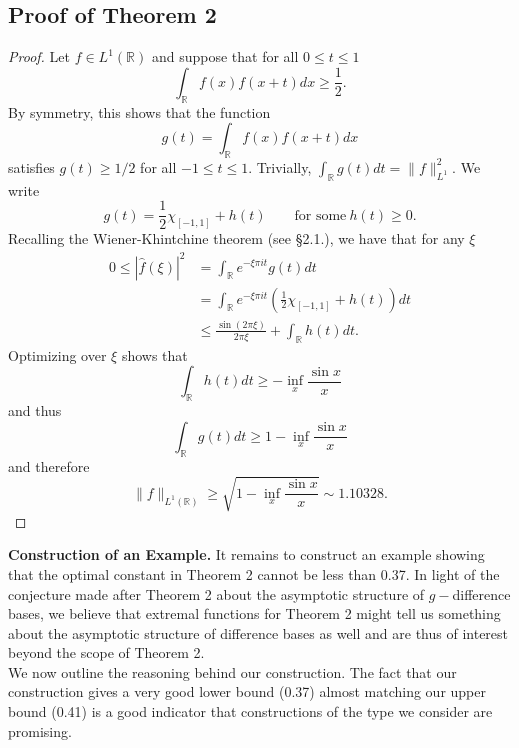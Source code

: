 \documentclass{amsart}
\theoremstyle{remark}
\begin{document}
{\subsection{Proof of Theorem 2}
\begin{proof} 
Let $f \in L^1(\mathbb{R})$ and suppose that for all $0 \leq t \leq 1$
$$ \int_{\mathbb{R}}{f(x)f(x+t)dx} \geq \frac{1}{2}.$$
By symmetry, this shows that the function
$$ g(t) =  \int_{\mathbb{R}}{f(x)f(x+t)dx}$$
satisfies $g(t) \geq 1/2$ for all $-1 \leq t \leq 1$.
Trivially, $\int_{\mathbb{R}}{g(t) dt} = \|f\|_{L^1}^2$. We write
$$ g(t) = \frac{1}{2} \chi_{[-1,1]} + h(t) \qquad \mbox{for some}~h(t) \geq 0.$$
Recalling the Wiener-Khintchine theorem (see \S 2.1.), we have that for any $\xi$
\begin{align*}
 0 \leq |\widehat{f}(\xi)|^2 &= \int_{\mathbb{R}}{e^{-\xi \pi i t} g(t)dt} \\
 &= \int_{\mathbb{R}}{e^{-\xi \pi i t} \left(  \frac{1}{2} \chi_{[-1,1]} + h(t) \right) dt} \\
 &\leq \frac{\sin{(2 \pi \xi)}}{2 \pi \xi}+ \int_{\mathbb{R}}{ h(t)dt}.
 \end{align*}
Optimizing over $\xi$ shows that
$$\int_{\mathbb{R}}{h(t) dt} \geq  - \inf_{x}\frac{\sin{x}}{x}$$
and thus
$$\int_{\mathbb{R}}{g(t) dt} \geq  1- \inf_{x}\frac{\sin{x}}{x}$$
and therefore
$$\| f\|_{L^1(\mathbb{R})} \geq \sqrt{1 - \inf_{x}\frac{\sin{x}}{x}} \sim 1.10328.$$
\end{proof}

\textbf{Construction of an Example.}
It remains to construct an example showing that the optimal constant in Theorem 2 cannot be less than 0.37. In light of the conjecture
made after Theorem 2 about the asymptotic structure of $g-$difference bases, we believe that extremal functions for Theorem 2 might
tell us something about the asymptotic structure of difference bases as well and are thus of interest beyond the scope of Theorem 2.\\

We now outline the reasoning behind our construction. The fact that our construction gives a very good lower bound (0.37)
almost matching our upper bound (0.41) is a good indicator that constructions of the type we consider are promising.

}
\end{document}
